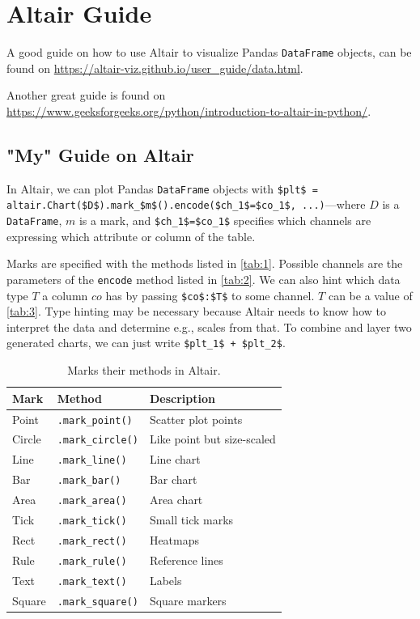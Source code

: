 \chapter{Altair Guide}
A good guide on how to use Altair to visualize Pandas \lstinline|DataFrame| objects, can be found on \url{https://altair-viz.github.io/user_guide/data.html}.

Another great guide is found on \url{https://www.geeksforgeeks.org/python/introduction-to-altair-in-python/}.

\section{"My" Guide on Altair}
In Altair, we can plot Pandas \lstinline|DataFrame| objects with \lstinline|$plt$ = altair.Chart($D$).mark_$m$().encode($ch_1$=$co_1$, ...)|---where \(D\) is a \lstinline|DataFrame|, \(m\) is a mark, and \lstinline|$ch_1$=$co_1$| specifies which channels are expressing which attribute or column of the table.

Marks are specified with the methods listed in \autoref{tab:1}.
Possible channels are the parameters of the \lstinline|encode| method listed in \autoref{tab:2}.
We can also hint which data type \(T\) a column \(co\) has by passing \lstinline|$co$:$T$| to some channel.
\(T\) can be a value of \autoref{tab:3}.
Type hinting may be necessary because Altair needs to know how to interpret the data and determine e.g., scales from that.
To combine and layer two generated charts, we can just write \lstinline|$plt_1$ + $plt_2$|.

\begin{table}[t]
    \centering
    \begin{tabular}{lll}
        \hline
        \textbf{Mark} & \textbf{Method} & \textbf{Description} \\
        \hline
        Point   & \texttt{.mark\_point()}   & Scatter plot points \\
        Circle  & \texttt{.mark\_circle()}  & Like point but size-scaled \\
        Line    & \texttt{.mark\_line()}    & Line chart \\
        Bar     & \texttt{.mark\_bar()}     & Bar chart \\
        Area    & \texttt{.mark\_area()}    & Area chart \\
        Tick    & \texttt{.mark\_tick()}    & Small tick marks \\
        Rect    & \texttt{.mark\_rect()}    & Heatmaps \\
        Rule    & \texttt{.mark\_rule()}    & Reference lines \\
        Text    & \texttt{.mark\_text()}    & Labels \\
        Square  & \texttt{.mark\_square()}  & Square markers \\
        \hline
    \end{tabular}
    \caption{Marks their methods in Altair.}
    \label{tab:1}
\end{table}

